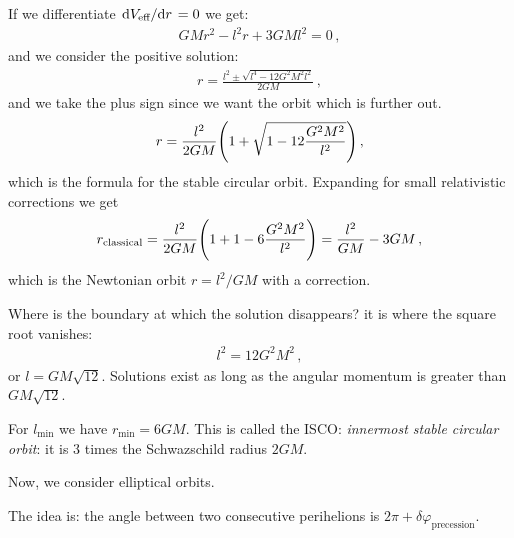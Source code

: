 \documentclass[main.tex]{subfiles}
\begin{document}
If we differentiate \(\dv*{V _{\text{eff}}}{r}= 0\) we get: 
%
\begin{align}
  GM r^2 - l^2 r + 3GM l^2 = 0
\,,
\end{align}
%
and we consider the positive solution: 
%
\begin{align}
  r= \frac{l^2 \pm \sqrt{l^4 - 12 G^2M^2l^2}}{2GM}
\,,
\end{align}
%
and we take the plus sign since we want the orbit which is further out. 
%
\begin{align}
  r = \frac{l^2}{2GM} \qty(1 + \sqrt{1 - 12 \frac{G^2M^2}{l^2}})
\,,
\end{align}
%
which is the formula for the stable circular orbit.
Expanding for small relativistic corrections we get 
%
\begin{align}
  r _{\text{classical}} = \frac{l^2}{2GM} \qty(1+1-6 \frac{G^2M^2}{l^2}) = \frac{l^2}{GM} - 3GM
\,,
\end{align}
%
which is the Newtonian orbit \(r = l^2/GM\) with a correction.

Where is the boundary at which the solution disappears? it is where the square root vanishes: 
%
\begin{align}
  l^2 = 12 G^2 M^2
\,,
\end{align}
%
or \(l = GM \sqrt{12}\). Solutions exist as long as the angular momentum is greater than \(GM \sqrt{12}\).

For \(l _{\text{min}}\) we have \(r _{\text{min}} = 6 GM\).
This is called the ISCO: \emph{innermost stable circular orbit}: it is \(3\) times the Schwazschild radius \(2GM\).

Now, we consider elliptical orbits.

The idea is: the angle between two consecutive perihelions is \(2\pi + \delta \varphi _{\text{precession}}\).
\end{document}
